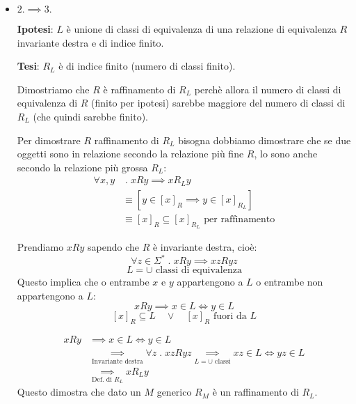 \documentclass[a4paper]{article}
\begin{document}
\begin{theorem}
\begin{itemize}
    \item \( 2. \implies 3. \)

      \textbf{Ipotesi}: \( L \) è unione di classi di equivalenza di
      una relazione di equivalenza \( R \) invariante destra e di indice finito.

      \textbf{Tesi}: \( R_L \) è di indice finito (numero di classi finito).

      \vspace{1em}
      \noindent
      Dimostriamo che \( R \) è raffinamento di \( R_L \) perchè allora il numero
      di classi di equivalenza di \( R \) (finito per ipotesi) sarebbe maggiore del numero di classi
      di \( R_L \) (che quindi sarebbe finito).

      Per dimostrare \( R \) raffinamento di \( R_L \) bisogna dobbiamo dimostrare
      che se due oggetti sono in relazione secondo la relazione più fine \( R \), lo sono
      anche secondo la relazione più grossa \( R_L \):
      \[
        \begin{aligned}
          \forall x,y &\;.\; xRy \implies x R_L y\\
                      &\equiv \left[ y \in [x]_R \implies y \in [x]_{R_L} \right]\\
                      &\equiv [x]_R \subseteq [x]_{R_L} \text{ per raffinamento}
        \end{aligned}
      \] 

      Prendiamo \( xRy \) sapendo che \( R \) è invariante destra, cioè:
      \[
        \forall z \in \Sigma^* \;.\; xRy \implies xzRyz
      \] 
      \[
        L = \cup \text{ classi di equivalenza}
      \] 
      Questo implica che o entrambe \( x \) e \( y \) appartengono a \( L \) o entrambe
      non appartengono a \( L \):
      \[
        xRy \implies x \in L \iff y \in L
      \] 
      \[
        [x]_R \subseteq L \quad \vee \quad [x]_R \text{ fuori da } L
      \] 

      \[
        \begin{aligned}
          xRy &\implies x \in L \iff y \in L\\
              &\underset{\text{Invariante destra}}{\implies}
              \forall z \;.\; xz R yz
              \underset{L = \cup \text{ classi}}{\implies} xz \in L \iff yz \in L\\
              &\underset{\text{Def. di } R_L}{\implies} x R_L y
        \end{aligned}
      \] 
      Questo dimostra che dato un \( M \) generico \( R_M \) è un raffinamento di \( R_L \).


\end{itemize}
\end{theorem}
\end{document}
